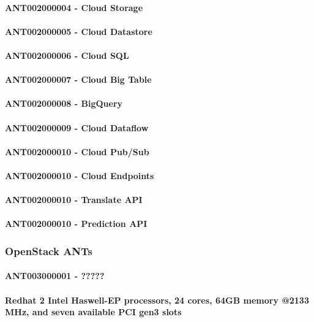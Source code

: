 \paragraph{ANT002000004 - Cloud Storage}
\paragraph{ANT002000005 - Cloud Datastore}
\paragraph{ANT002000006 - Cloud SQL}
\paragraph{ANT002000007 - Cloud Big Table}
\paragraph{ANT002000008 - BigQuery}
\paragraph{ANT002000009 - Cloud Dataflow}
\paragraph{ANT002000010 - Cloud Pub/Sub}
\paragraph{ANT002000010 - Cloud Endpoints}
\paragraph{ANT002000010 - Translate API}
\paragraph{ANT002000010 - Prediction API}
\subsubsection{OpenStack ANTs}
\paragraph{ANT003000001 - ?????}
\paragraph{Redhat 2 Intel Haswell-EP processors, 24 cores, 64GB memory @2133 MHz, and seven available PCI gen3 slots}
